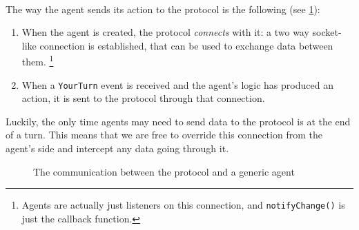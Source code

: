 \documentclass[12pt]{article}
\numberwithin{equation}{section}
\begin{document}
			\paragraph*{}
				The way the agent sends its action to the protocol is the following (see \cref{fig:protocol-agent_connection}):
				\begin{enumerate}
					\item When the agent is created, the protocol \emph{connects} with it: a two way socket-like connection is established, that can be used to exchange data between them. \footnote{Agents are actually just listeners on this connection, and \texttt{notifyChange()} is just the callback function.}
					
					\item When a \texttt{YourTurn} event is received and the agent's logic has produced an action, it is sent to the protocol through that connection.
				\end{enumerate}
				Luckily, the only time agents may need to send data to the protocol is at the end of a turn. This means that we are free to override this connection from the agent's side and intercept any data going through it.

			\begin{figure}[H]
				\centering
				\captionsetup{justification=centering}
				\caption{The communication between the protocol and a generic agent}
				\label{fig:protocol-agent_connection}
			\end{figure}
			
\end{document}
